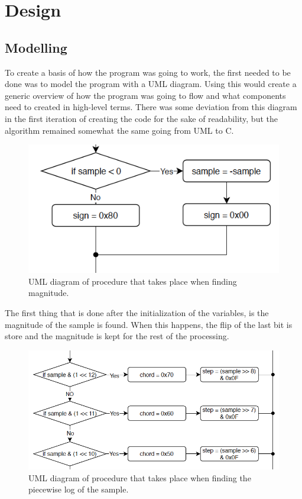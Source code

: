 \documentclass[12pt]{article}
\begin{document}
\section{Design}

\subsection{Modelling}

To create a basis of how the program was going to work, the first needed to be done was to model the program with a UML diagram. Using this would create a generic overview of how the program was going to flow and what components need to created in high-level terms. There was some deviation from this diagram in the first iteration of creating the code for the sake of readability, but the algorithm remained somewhat the same going from UML to C. 

\begin{figure}[!h]
	\centering
	\includegraphics[scale=1]{mag_uml.png}
	\caption{\label{fig:mag_uml}UML diagram of procedure that takes place when finding magnitude.}
\end{figure}

The first thing that is done after the initialization of the variables, is the magnitude of the sample is found. When this happens, the flip of the last bit is store and the magnitude is kept for the rest of the processing. \\

\begin{figure}[!h]
	\centering
	\includegraphics[scale=1]{step_uml.png}
	\caption{UML diagram of procedure that takes place when finding the piecewise log of the sample.}
\end{figure}
\end{document}
